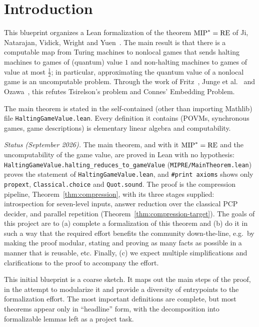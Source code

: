 \section{Introduction}
\label{ch:introduction}

This blueprint organizes a Lean formalization of the theorem $\mathrm{MIP}^* = \mathrm{RE}$ of
Ji, Natarajan, Vidick, Wright and Yuen~\cite{JNVWY20}. The main result is that
there is a computable map from Turing machines to nonlocal games that sends halting
machines to games of (quantum) value $1$ and non-halting machines to games of value at
most $\frac12$; in particular, approximating the quantum value of a nonlocal game is an
uncomputable problem. Through the work of Fritz~\cite{Fri12}, Junge et
al.~\cite{JNPPSW11} and Ozawa~\cite{Oza13}, this refutes Tsirelson's problem and Connes'
Embedding Problem.

The main theorem is stated in the self-contained (other than importing Mathlib) file
\texttt{HaltingGameValue.lean}. Every definition it contains
(POVMs, synchronous games, game descriptions) is elementary linear algebra and
computability.

\emph{Status (September 2026).} The main theorem, and with it $\mathrm{MIP}^* = \mathrm{RE}$ and the
uncomputability of the game value, are proved in Lean with no hypothesis:
\texttt{HaltingGameValue.halting\_reduces\_to\_gameValue} (\texttt{MIPRE/MainTheorem.lean}) proves
the statement of \texttt{HaltingGameValue.lean}, and \texttt{\#print axioms} shows only
\texttt{propext}, \texttt{Classical.choice} and \texttt{Quot.sound}. The proof is the compression
pipeline, Theorem~\ref{thm:compression}, with its three stages supplied: introspection for
seven-level inputs, answer reduction over the classical PCP decider, and parallel repetition
(Theorem~\ref{thm:compression-target}). The goals of this project are to (a) complete a formalization of this theorem and
(b) do it in such a way that the required effort benefits the community down-the-line, e.g.\ by
making the proof modular, stating and proving as many facts as possible in a manner that is reusable, etc.
Finally, (c) we expect multiple simplifications and clarifications to the proof to accompany the effort.


This initial blueprint is a coarse sketch. It maps out the main steps of the proof, in the
attempt to modularize it and provide a diversity of entrypoints to the formalization effort.
The most important definitions are complete, but most theorems appear only in ``headline'' form,
 with the
decomposition into formalizable lemmas left as a project task.

